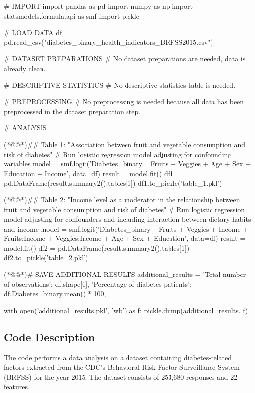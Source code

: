 \documentclass[11pt]{article}
\begin{document}
\begin{python}

# IMPORT
import pandas as pd
import numpy as np
import statsmodels.formula.api as smf
import pickle

# LOAD DATA
df = pd.read_csv("diabetes_binary_health_indicators_BRFSS2015.csv")

# DATASET PREPARATIONS
# No dataset preparations are needed, data is already clean.

# DESCRIPTIVE STATISTICS
# No descriptive statistics table is needed.

# PREPROCESSING 
# No preprocessing is needed because all data has been preprocessed in the dataset preparation step.

# ANALYSIS

(*@@*)## Table 1: "Association between fruit and vegetable consumption and risk of diabetes"
# Run logistic regression model adjusting for confounding variables
model = smf.logit('Diabetes_binary ~ Fruits + Veggies + Age + Sex + Education + Income', data=df)
result = model.fit()
df1 = pd.DataFrame(result.summary2().tables[1])
df1.to_pickle('table_1.pkl')

(*@@*)## Table 2: "Income level as a moderator in the relationship between fruit and vegetable consumption and risk of diabetes"
# Run logistic regression model adjusting for confounders and including interaction between dietary habits and income
model = smf.logit('Diabetes_binary ~ Fruits + Veggies + Income + Fruits:Income + Veggies:Income + Age + Sex + Education', data=df)
result = model.fit()
df2 = pd.DataFrame(result.summary2().tables[1])
df2.to_pickle('table_2.pkl')

(*@@*)# SAVE ADDITIONAL RESULTS
additional_results = {
    'Total number of observations': df.shape[0],
    'Percentage of diabetes patients': df.Diabetes_binary.mean() * 100,
}

with open('additional_results.pkl', 'wb') as f:
    pickle.dump(additional_results, f)

\end{python}

\subsection{Code Description}

The code performs a data analysis on a dataset containing diabetes-related factors extracted from the CDC's Behavioral Risk Factor Surveillance System (BRFSS) for the year 2015. The dataset consists of 253,680 responses and 22 features.
\end{document}
